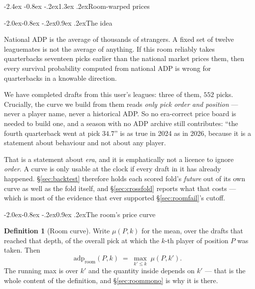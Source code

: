 \documentclass[10pt,a4paper]{article}
\makeatletter
\theoremstyle{plain}
\theoremstyle{definition}
\newtheorem{definition}[theorem]{Definition}
\theoremstyle{remark}
\newcommand{\adp}{\mathrm{adp}}
\renewcommand\section{\@startsection{section}{1}{\z@}%
  {-2.4ex \@plus -0.8ex \@minus -.2ex}{1.3ex \@plus.2ex}{\normalfont\Large\bfseries}}
\renewcommand\subsection{\@startsection{subsection}{2}{\z@}%
  {-2.0ex\@plus -0.8ex \@minus -.2ex}{0.9ex \@plus .2ex}{\normalfont\large\bfseries}}
\makeatother
\begin{document}
\section{Room-warped prices}
\label{sec:room}

\subsection{The idea}

National ADP is the average of thousands of strangers. A fixed set of twelve
leaguemates is not the average of anything. If this room reliably takes quarterbacks
seventeen picks earlier than the national market prices them, then every survival
probability computed from national ADP is wrong for quarterbacks in a knowable
direction.

We have completed drafts from this user's leagues: three of them, $552$ picks. Crucially,
the curve we build from them reads \emph{only pick order and position} --- never a player
name, never a historical ADP. So no era-correct price board is needed to build one, and a
season with no ADP archive still contributes: ``the fourth quarterback went at pick
$34.7$'' is as true in 2024 as in 2026, because it is a statement about behaviour and not
about any player.

That is a statement about \emph{era}, and it is emphatically not a licence to ignore
\emph{order}. A curve is only usable at the clock if every draft in it has already
happened. \S\ref{sec:backtest} therefore holds each scored fold's \emph{future} out of its
own curve as well as the fold itself, and \S\ref{sec:crossfold} reports what that costs
--- which is most of the evidence that ever supported \S\ref{sec:roomfail}'s cutoff.

\subsection{The room's price curve}

\begin{definition}[Room curve]
Write $\mu(P, k)$ for the mean, over the drafts that reached that depth, of the overall
pick at which the $k$-th player of position $P$ was taken. Then
\begin{equation}
\adp_{\text{room}}(P, k) \;=\; \max_{k' \le k}\; \mu(P, k').
\label{eq:roomcurve}
\end{equation}
The running max is over $k'$ and the quantity inside depends on $k'$ --- that is the
whole content of the definition, and \S\ref{sec:roommono} is why it is there.
\end{definition}
\end{document}
